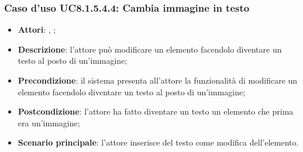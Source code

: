 		\subsubsection{Caso d'uso UC8.1.5.4.4: Cambia immagine in testo}
		\begin{itemize}
			\item \textbf{Attori}: \uau, \uaupro;
			\item \textbf{Descrizione}: l'attore può modificare un elemento facendolo diventare un testo al posto di un'immagine;
			\item \textbf{Precondizione}: il sistema presenta all'attore la funzionalità di modificare un elemento facendolo diventare un testo al posto di un'immagine;
			\item \textbf{Postcondizione}: l'attore ha fatto diventare un testo un elemento che prima era un'immagine;
			\item \textbf{Scenario principale}: l'attore inserisce del testo come modifica dell'elemento.  
		\end{itemize}
		
